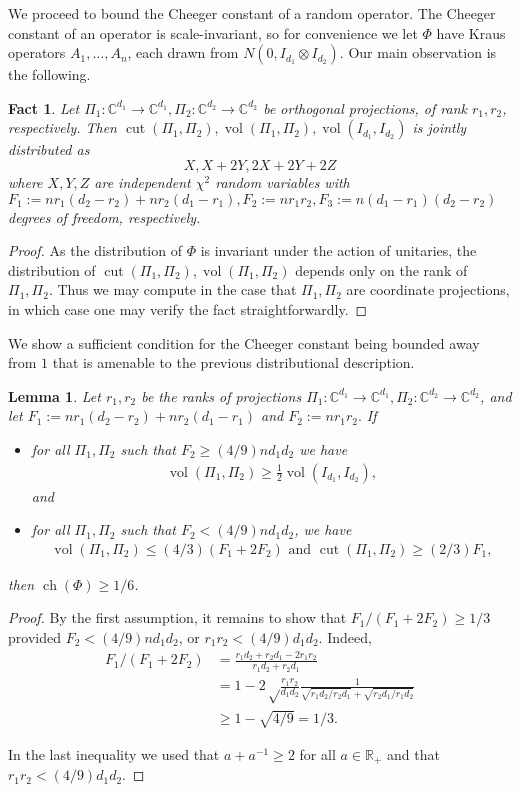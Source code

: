 \documentclass{article}
\newtheorem{lemma}[theorem]{Lemma}
\newtheorem{fact}[theorem]{Fact}
\newcommand{\R}{{\mathbb{R}}}
\newcommand{\C}{{\mathbb{C}}}
\newcommand{\ot}{\otimes}
\newcommand{\ch}{\operatorname{ch}}
\newcommand{\cut}{\operatorname{cut}}
\newcommand{\vol}{\operatorname{vol}}
\begin{document}
We proceed to bound the Cheeger constant of a random operator. The Cheeger constant of an operator is scale-invariant, so for convenience we let $\Phi$ have Kraus operators $A_1, \dots, A_n$, each drawn from $N(0,  I_{d_1} \ot I_{d_2}).$ Our main observation is the following. 
\begin{fact}\label{fact:chi} Let $\Pi_1:\C^{d_1} \to \C^{d_1}, \Pi_2: \C^{d_2} \to \C^{d_2}$ be orthogonal projections, of rank $r_1, r_2$, respectively. Then $\cut(\Pi_1, \Pi_2), \vol(\Pi_1, \Pi_2), \vol(I_{d_1}, I_{d_2})$ is jointly distributed as 
$$ X, X + 2Y, 2X + 2 Y + 2Z$$ where 
$X, Y, Z$ are independent $\chi^2$ random variables with $F_1:=n r_1(d_2 - r_2) + n r_2(d_1-r_1), F_2:= n r_1r_2, F_3:= n(d_1 - r_1)(d_2 - r_2)$ degrees of freedom, respectively. 
\end{fact} 
\begin{proof} As the distribution of $\Phi$ is invariant under the action of unitaries, the distribution of $\cut(\Pi_1, \Pi_2), \vol(\Pi_1, \Pi_2)$ depends only on the rank of $\Pi_1, \Pi_2$. Thus we may compute in the case that $\Pi_1, \Pi_2$ are coordinate projections, in which case one may verify the fact straightforwardly. 
\end{proof}


 We show a sufficient condition for the Cheeger constant being bounded away from $1$ that is amenable to the previous distributional description.
\begin{lemma}\label{lem:suff}
Let $r_1, r_2$ be the ranks of projections $\Pi_1: \C^{d_1} \to \C^{d_1}, \Pi_2: \C^{d_2} \to \C^{d_2}$, and let $F_1:= n r_1(d_2 - r_2) + n r_2(d_1-r_1)$ and $F_2:=n r_1r_2.$ If 
\begin{itemize}
\item for all $\Pi_1, \Pi_2$ such that $F_2 \geq (4/9) n d_1 d_2$ we have 
\begin{gather}\vol(\Pi_1, \Pi_2) \geq \frac{1}{2} \vol(I_{d_1}, I_{d_2}),\label{eq:vol}\end{gather} and
\item for all $\Pi_1, \Pi_2$ such that $F_2 < (4/9) n d_1 d_2$, we have 
\begin{gather} \vol(\Pi_1, \Pi_2) \leq (4/3)(F_1 + 2 F_2) \textrm{ and } \cut(\Pi_1, \Pi_2) \geq (2/3) F_1,\label{eq:cut} \end{gather}
\end{itemize}
then $\ch(\Phi) \geq 1/6$. 
\end{lemma}
\begin{proof} By the first assumption, it remains to show that $F_1/(F_1 + 2 F_2) \geq 1/3$ provided $F_2 < (4/9) n d_1 d_2$, or $r_1 r_2 < (4/9) d_1 d_2$. Indeed, 
\begin{align*}F_1/(F_1 + 2 F_2) &= \frac{r_1 d_2 + r_2 d_1 - 2 r_1 r_2}{r_1 d_2 + r_2 d_1}\\
 &= 1 -2 \sqrt\frac{ r_1 r_2}{d_1 d_2} \frac{1}{ \sqrt{ r_1 d_2/r_2 d_1} + \sqrt{r_2 d_1/ r_1 d_2}} \\
 &\geq 1 - \sqrt{4/9} = 1/3.
\end{align*}

In the last inequality we used that $a + a^{-1} \geq 2$ for all $a \in \R_+$ and that $r_1 r_2 < (4/9) d_1 d_2$. \end{proof}
\end{document}
